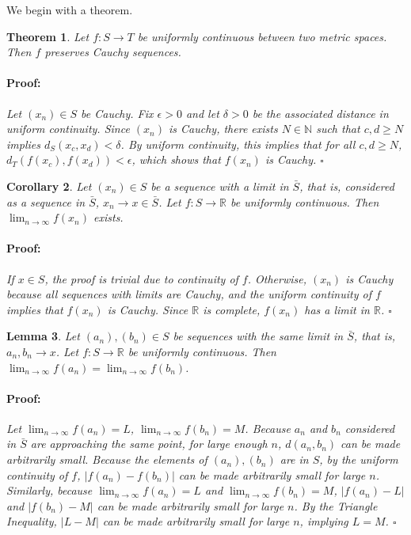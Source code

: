 \documentclass{article}
\newenvironment{proof}{\paragraph{Proof:}}{\hfill$\square$}
\newtheorem{theorem}{Theorem}
\newtheorem{lemma}[theorem]{Lemma}
\newtheorem{corollary}[theorem]{Corollary}
\newcommand{\N}{\mathbb{N}}
\newcommand{\R}{\mathbb{R}}
\begin{document}
We begin with a theorem.

\begin{theorem}
Let $f: S \rightarrow T$ be uniformly continuous between two metric spaces. Then $f$ preserves Cauchy sequences.

\begin{proof}
Let $(x_n) \in S$ be Cauchy. Fix $\epsilon > 0$ and let $\delta > 0$ be the associated distance in uniform continuity. Since $(x_n)$ is Cauchy, there exists $N \in \N$ such that $c, d \geq N$ implies $d_S(x_c, x_d) < \delta$. By uniform continuity, this implies that for all $c, d \geq N$, $d_T(f(x_c), f(x_d)) < \epsilon$, which shows that $f(x_n)$ is Cauchy.
\end{proof}
\end{theorem}

\begin{corollary}
Let $(x_n) \in S$ be a sequence with a limit in $\bar{S}$, that is, considered as a sequence in $\bar{S}$, $x_n \rightarrow x \in \bar{S}$. Let $f: S \rightarrow \R$ be uniformly continuous. Then $\lim_{n \rightarrow \infty} f(x_n)$ exists.

\begin{proof}
If $x \in S$, the proof is trivial due to continuity of $f$. Otherwise, $(x_n)$ is Cauchy because all sequences with limits are Cauchy, and the uniform continuity of $f$ implies that $f(x_n)$ is Cauchy. Since $\R$ is complete, $f(x_n)$ has a limit in $\R$.
\end{proof}
\end{corollary}

\begin{lemma}
\label{FunctionLimitsUnique}
Let $(a_n), (b_n) \in S$ be sequences with the same limit in $\bar{S}$, that is, $a_n, b_n \rightarrow x$. Let $f: S \rightarrow \R$ be uniformly continuous. Then $\lim_{n \rightarrow \infty} f(a_n) = \lim_{n \rightarrow \infty} f(b_n)$.

\begin{proof}
Let $\lim_{n \rightarrow \infty} f(a_n) = L$, $\lim_{n \rightarrow \infty} f(b_n) = M$. Because $a_n$ and $b_n$ considered in $\bar{S}$ are approaching the same point, for large enough $n$, $d(a_n, b_n)$ can be made arbitrarily small. Because the elements of $(a_n), (b_n)$ are in $S$, by the uniform continuity of $f$, $|f(a_n) - f(b_n)|$ can be made arbitrarily small for large $n$. Similarly, because $\lim_{n \rightarrow \infty} f(a_n) = L$ and $\lim_{n \rightarrow \infty} f(b_n) = M$, $|f(a_n)-L|$ and $|f(b_n)-M|$ can be made arbitrarily small for large $n$. By the Triangle Inequality, $|L-M|$ can be made arbitrarily small for large $n$, implying $L = M$.
\end{proof}
\end{lemma}
\end{document}
